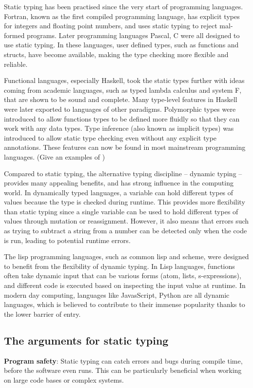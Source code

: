 Static typing has been practised since the very start of programming languages. Fortran, known as the first compiled programming language, has explicit types for integers and floating point numbers, and uses static typing to reject mal-formed programs. Later programming languages Pascal, C were all designed to use static typing. In these languages, user defined types, such as functions and structs, have become available, making the type checking more flexible and reliable.

 
Functional languages, especially Haskell, took the static types further with ideas coming from academic languages, such as typed lambda calculus and system F, that are shown to be sound and complete. Many type-level features in Haskell were later exported to languages of other paradigms.  Polymorphic types were introduced to allow functions types to be defined more fluidly so that they can work with any data types. Type inference (also known as implicit types) was introduced to allow static type checking even without any explicit type annotations. These features can now be found in most mainstream programming languages. (Give an examples of )


Compared to static typing, the alternative typing discipline – dynamic typing – provides many appealing benefits, and has strong influence in the computing world. In dynamically typed languages, a variable can hold different types of values because the type is checked during runtime. This provides more flexibility than static typing since a single variable can be used to hold different types of values through mutation or reassignment. However, it also means that errors such as trying to subtract a string from a number can be detected only when the code is run, leading to potential runtime errors.


The lisp programming languages, such as common lisp and scheme, were designed to benefit from the flexibility of dynamic typing. In Lisp languages, functions often take dynamic input that can be various forms (atom, lists, s-expressions), and different code is executed based on inspecting the input value at runtime. In modern day computing,  languages like JavasScript, Python are all dynamic languages, which is believed to contribute to their immense popularity thanks to the lower barrier of entry.

\subsection{The arguments for static typing}
\textbf{Program safety}: Static typing can catch errors and bugs during compile time, before the software even runs. This can be particularly beneficial when working on large code bases or complex systems.

